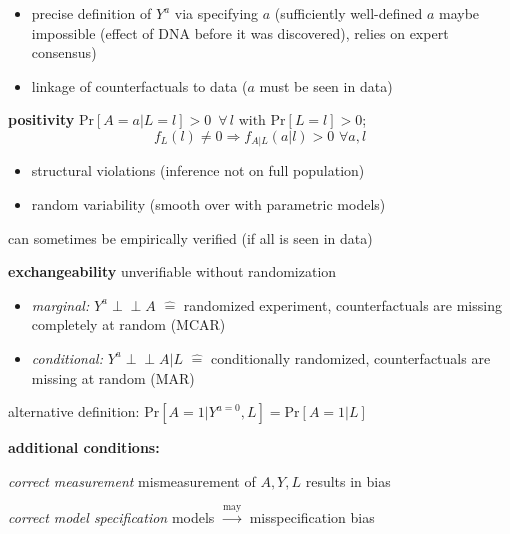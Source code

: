 \documentclass[8pt,oneside]{extarticle}
\newcommand{\indep}{\perp \!\!\! \perp}
\begin{document}
\begin{multicols}{2}
\begin{itemize}[itemsep=0em, topsep=0pt, partopsep=0pt,parsep=0pt, leftmargin=1.5em]
\setlength{\itemsep}{0pt}%
\setlength{\parskip}{0pt}
\item precise definition of $Y^a$ via specifying $a$ (sufficiently well-defined $a$ maybe impossible (effect of DNA before it was discovered), relies on expert consensus)
\item linkage of counterfactuals to data ($a$ must be seen in data) 
\end{itemize}

\noindent \textbf{positivity} $\mathrm{Pr}\left[A=a|L=l\right] >0 \,\,\, \forall \, l \text{ with } \mathrm{Pr}\left[L=l\right]>0$; $$f_L(l)\neq 0 \Rightarrow f_{A|L}(a|l)>0 \,\, \forall a,l$$

\begin{itemize}[itemsep=0em, topsep=0pt, partopsep=0pt,parsep=0pt, leftmargin=1.5em]
\setlength{\itemsep}{0pt}%
\setlength{\parskip}{0pt}
\item structural violations (inference not on full population)
\item random variability (smooth over with parametric models)
\end{itemize}
\noindent can sometimes be empirically verified (if all is seen in data)

\noindent \textbf{exchangeability} unverifiable without randomization
\begin{itemize}[itemsep=0em, topsep=0pt, partopsep=0pt,parsep=0pt, leftmargin=1.5em]
\setlength{\itemsep}{0pt}%
\setlength{\parskip}{0pt}
\item \textit{marginal:} $Y^a \indep A$ $\widehat{=}$ randomized experiment, \newline counterfactuals are missing completely at random (MCAR)

\item \textit{conditional:} $Y^a {\indep} A|L$ $\widehat{=}$ conditionally randomized, counterfactuals are missing at random (MAR)
\end{itemize}
alternative definition: $ \mathrm{Pr}\left[A=1|Y^{a=0}, L\right] = \mathrm{Pr}\left[A=1|L\right]$

\noindent \textbf{additional conditions:}

\noindent \textit{correct measurement} mismeasurement of $A, Y, L$ results in bias

\noindent \textit{correct model specification} models $\overset{\text{may}}{\rightarrow}$ misspecification bias





\end{multicols}
\end{document}
